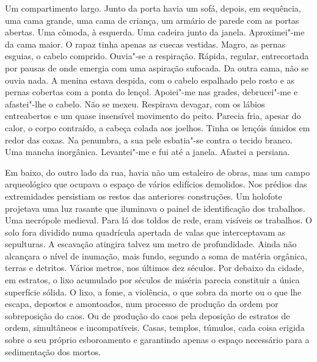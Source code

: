 Um compartimento largo. Junto da porta havia um sofá, depois, em
sequência, uma cama grande, uma cama de criança, um armário de parede
com as portas abertas. Uma cômoda, à esquerda. Uma cadeira junto da
janela. Aproximei"-me da cama maior. O rapaz tinha apenas as cuecas
vestidas. Magro, as pernas esguias, o cabelo comprido. Ouvia"-se a
respiração. Rápida, regular, entrecortada por pausas de onde emergia com
uma aspiração sufocada. Da outra cama, não se ouvia nada. A menina
estava despida, com o cabelo espalhado pelo rosto e as pernas cobertas
com a ponta do lençol. Apoiei"-me nas grades, debrucei"-me e
afastei"-lhe o cabelo. Não se mexeu. Respirava devagar, com os lábios
entreabertos e um quase insensível movimento do peito. Parecia fria,
apesar do calor, o corpo contraído, a cabeça colada aos joelhos. Tinha
os lençóis úmidos em redor das coxas. Na penumbra, a sua pele
esbatia"-se contra o tecido branco. Uma mancha inorgânica. Levantei"-me
e fui até a janela. Afastei a persiana.

Em baixo, do outro lado da rua, havia não um estaleiro de obras, mas um
campo arqueológico que ocupava o espaço de vários edifícios demolidos.
Nos prédios das extremidades persistiam os restos das anteriores
construções. Um holofote projetava uma luz rasante que iluminava o
painel de identificação dos trabalhos. Uma necrópole medieval. Para lá
dos toldos de rede, eram visíveis os trabalhos. O solo fora dividido
numa quadrícula apertada de valas que interceptavam as sepulturas. A
escavação atingira talvez um metro de profundidade. Ainda não alcançara
o nível de inumação, mais fundo, segundo a soma de matéria orgânica,
terras e detritos. Vários metros, nos últimos dez séculos. Por debaixo
da cidade, em estratos, o lixo acumulado por séculos de miséria parecia
constituir a única superfície sólida. O lixo, a fome, a violência, o que
sobra da morte ou o que lhe escapa, depostos e amontoados, num processo
de produção da ordem por sobreposição do caos. Ou de produção do caos
pela deposição de estratos de ordem, simultâneos e incompatíveis. Casas,
templos, túmulos, cada coisa erigida sobre o seu próprio esboroamento e
garantindo apenas o espaço necessário para a sedimentação dos mortos.

